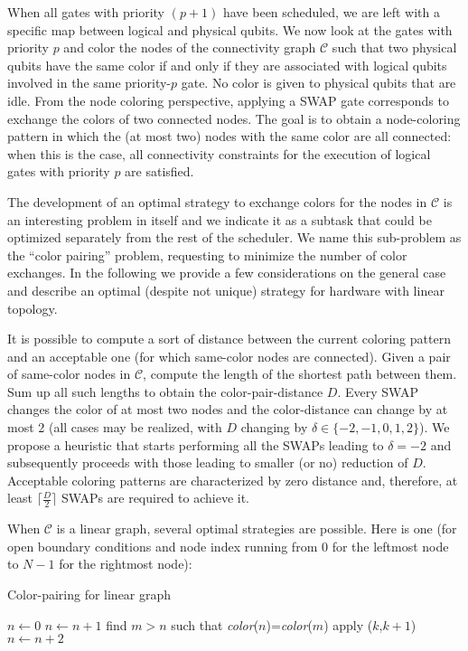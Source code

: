 \documentclass[%
onecolumn,pra,
superscriptaddress,
nofootinbib,
 amsmath,amssymb,
 aps,
11pt,
]{revtex4-1}
\begin{document}
When all gates with priority $(p+1)$ have been scheduled, we are left with a specific map between logical and physical qubits. We now look at the gates with priority $p$ and color the nodes of the connectivity graph $\mathcal{C}$ such that two physical qubits have the same color if and only if they are associated with logical qubits involved in the same priority-$p$ gate. No color is given to physical qubits that are idle. From the node coloring perspective, applying a SWAP gate corresponds to exchange the colors of two connected nodes. The goal is to obtain a node-coloring pattern in which the (at most two) nodes with the same color are all connected: when this is the case, all connectivity constraints for the execution of logical gates with priority $p$ are satisfied.

The development of an optimal strategy to exchange colors for the nodes in $\mathcal{C}$ is an interesting problem in itself and we indicate it as a subtask that could be optimized separately from the rest of the scheduler.  We name this sub-problem as the ``color pairing'' problem, requesting to minimize the number of color exchanges. In the following we provide a few considerations on the general case and describe an optimal (despite not unique) strategy for hardware with linear topology.

It is possible to compute a sort of distance between the current coloring pattern and an acceptable one (for which same-color nodes are connected). Given a pair of same-color nodes in $\mathcal{C}$, compute the length of the shortest path between them. Sum up all such lengths to obtain the color-pair-distance $D$. Every SWAP changes the color of at most two nodes and the color-distance can change by at most 2 (all cases may be realized, with $D$ changing by $\delta\in\{-2,-1,0,1,2\}$). We propose a heuristic that starts performing all the SWAPs leading to $\delta=-2$ and subsequently proceeds with those leading to smaller (or no) reduction of $D$. Acceptable coloring patterns are characterized by zero distance and, therefore, at least $\lceil\frac{D}{2}\rceil$ SWAPs are required to achieve it.

When $\mathcal{C}$ is a linear graph, several optimal strategies are possible. Here is one (for open boundary conditions and node index running from $0$ for the leftmost node to $N-1$ for the rightmost node):

\begin{algorithm}[H]
\caption{Color-pairing for linear graph}\label{euclid}
\begin{algorithmic}[1]
\State $n \gets 0$
		\State $n \gets n+1$
    \Else
    	\State find $m>n$ such that \textit{color}($n$)=\textit{color}($m$)
        	\State apply ($k$,$k+1$)
        \EndFor
		\State $n \gets n+2$
	\EndIf
\EndWhile
\EndProcedure
\end{algorithmic}
\end{algorithm}
\end{document}
